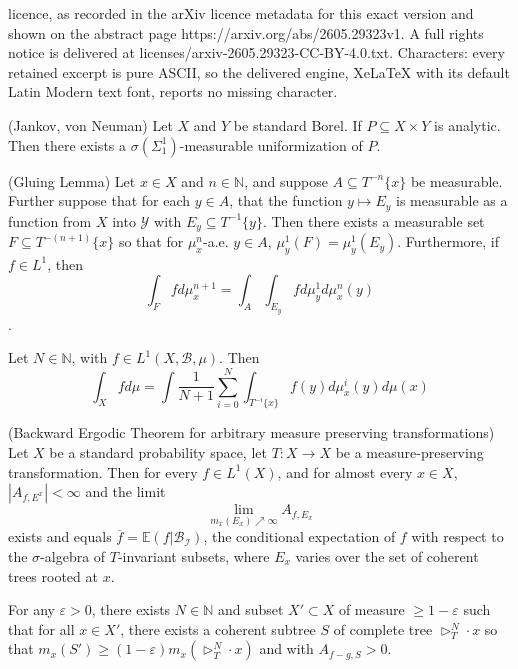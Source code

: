 \documentclass[10pt,a4paper]{amsart}
\newcommand{\B}{\mathcal{B}}
\newcommand{\N}{\mathbb{N}}
\newcommand{\abs}[1]{\left\vert#1\right\vert}
\begin{document}
licence, as recorded in the arXiv licence metadata for this exact version and shown on the abstract page https://arxiv.org/abs/2605.29323v1. A full rights notice is delivered at licenses/arxiv-2605.29323-CC-BY-4.0.txt. Characters: every retained excerpt is pure ASCII, so the delivered engine, XeLaTeX with its default Latin Modern text font, reports no missing character.
\begin{theorem}
    \label{JVN} (Jankov, von Neuman) Let $ X $ and $ Y $ be standard Borel. If $ P\subseteq X\times Y $ is analytic. Then there exists a $ \sigma(\Sigma^1_1) $-measurable uniformization of $ P $.
\end{theorem}

\begin{lemma}
    \label{gluing}(Gluing Lemma) Let $ x\in X $ and $ n\in \N $, and suppose $ A \subseteq T^{-n}\{x\} $ be measurable. Further suppose that for each $ y\in A $, that the function $ y\mapsto E_y $ is measurable as a function from $ X $ into $ \mathcal{Y} $ with $ E_y\subseteq T^{-1}\{y\} $. Then there exists a measurable set $ F\subseteq T^{-(n+1)}\{x\} $ so that for $ \mu_x^n $-a.e. $ y\in A $, $ \mu_y^1(F) = \mu_y^1(E_y) $. Furthermore, if $ f\in L^1 $, then 
    \[
    \int_{F} fd\mu_x^{n+1} = \int_A \int_{E_y} fd\mu_y^1d\mu_x^n(y)
    \].
\end{lemma}

\begin{lemma}\label{localglobal}
    Let $ N\in \N $, with $ f\in L^1(X,\B,\mu) $. Then
    \[
    \int_X fd\mu = \int \frac{1}{N+1}\sum_{i=0}^N \int_{T^{-i}\{x\}} f(y)d\mu^i_x(y) d\mu(x)
    \]
\end{lemma}

\begin{theorem}
    \label{The Theorem}(Backward Ergodic Theorem for arbitrary measure preserving transformations) Let $ X $ be a standard probability space, let $ T:X\rightarrow X $ be a measure-preserving transformation. Then for every $ f\in L^1(X) $, and for almost every $x \in X $, $ \abs{A_{f,E^x}} <\infty $ and the limit
    \[
    \lim_{m_x(E_x)\nearrow \infty} A_{f,E_x} 
    \]
    exists and equals $ \overline{f}= \mathbb{E}(f|\mathcal{B}_{\mathcal{I}}) $, the conditional expectation of $ f $ with respect to the $ \sigma $-algebra of $ T $-invariant subsets, where $ E_x$ varies over the set of coherent trees rooted at $x $.
\end{theorem}

    \begin{claim}\label{tiling}
        For any $ \varepsilon>0 $, there exists $ N\in \N $ and subset $ X'\subset X $ of measure $ \geq 1-\varepsilon $ such that for all $ x\in X' $, there exists a coherent subtree $ S $ of complete tree $ \triangleright_T^N\cdot x $ so that $ m_x(S')\geq (1-\varepsilon)m_x(\triangleright_T^N\cdot x) $ and with $ A_{f-g,S} >0 $. 
    \end{claim}
\end{document}
